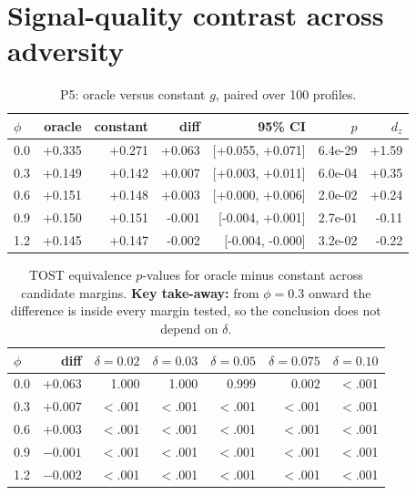 \documentclass{article}
\begin{document}
\section{Signal-quality contrast across adversity}
\label{app:p5}
\begin{table}[H]
  \caption{P5: oracle versus constant $g$, paired over 100 profiles.}
  \centering\small
  \begin{tabular}{lrrrrrr}
    \toprule
    $\phi$ & oracle & constant & diff & 95\% CI & $p$ & $d_z$ \\
    \midrule
    0.0 & +0.335 & +0.271 & +0.063 & [+0.055, +0.071] & 6.4e-29 & +1.59 \\
    0.3 & +0.149 & +0.142 & +0.007 & [+0.003, +0.011] & 6.0e-04 & +0.35 \\
    0.6 & +0.151 & +0.148 & +0.003 & [+0.000, +0.006] & 2.0e-02 & +0.24 \\
    0.9 & +0.150 & +0.151 & -0.001 & [-0.004, +0.001] & 2.7e-01 & -0.11 \\
    1.2 & +0.145 & +0.147 & -0.002 & [-0.004, -0.000] & 3.2e-02 & -0.22 \\
    \bottomrule
  \end{tabular}
\end{table}
\begin{table}[H]
  \caption{TOST equivalence $p$-values for oracle minus constant across candidate margins. \textbf{Key take-away:} from $\phi{=}0.3$ onward the difference is inside every margin tested, so the conclusion does not depend on $\delta$.}
  \centering\small
  \begin{tabular}{lrrrrrr}
    \toprule
    $\phi$ & diff & $\delta{=}0.02$ & $\delta{=}0.03$ & $\delta{=}0.05$ & $\delta{=}0.075$ & $\delta{=}0.10$ \\
    \midrule
    0.0 & +0.063 & 1.000 & 1.000 & 0.999 & 0.002 & $<$.001 \\
    0.3 & +0.007 & $<$.001 & $<$.001 & $<$.001 & $<$.001 & $<$.001 \\
    0.6 & +0.003 & $<$.001 & $<$.001 & $<$.001 & $<$.001 & $<$.001 \\
    0.9 & $-0.001$ & $<$.001 & $<$.001 & $<$.001 & $<$.001 & $<$.001 \\
    1.2 & $-0.002$ & $<$.001 & $<$.001 & $<$.001 & $<$.001 & $<$.001 \\
    \bottomrule
  \end{tabular}
\end{table}
\end{document}
